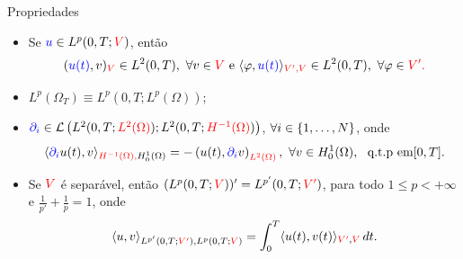 \begin{frame}{Propriedades}

\begin{itemize}
\item Se \({\color{blue}u}\in L^p(0,T;{\color{red}V})\), então 
\[
({\color{blue}u(t)},v)_{\color{red}V}\in L^2(0,T),\  \forall v\in {\color{red}V} \text{ e } \innp{\varphi,{\color{blue}u(t)}}_{{\color{red}V',V}}\in L^2(0,T), \ \forall \varphi \in {\color{red}V'.}
\]

\item \(L^p(\Omega_T)\equiv L^p(0,T;L^p(\Omega))\);
\medskip


\item \({\color{blue}\partial_i }\in
 \mathcal{L}\left(L^2(0,T;{\color{red}L^2(\Omega)});L^2(0,T;{\color{red}H^{-1}(\Omega)}) \right)\), 
\(\forall i\in \{1,\ldots,N\}\), onde 
\[
\langle{\color{blue}\partial_i} u(t),{v}\rangle_{{\color{red}H^{-1}(\Omega),}H_0^1(\Omega)}
=-\left(u(t),{\color{blue}\partial_i}{v}\right)_{{\color{red}L^2(\Omega)}},\
\forall v\in H_0^1(\Omega),\  \text{ q.t.p em} [0,T].
\]


\item Se \({\color{red}V}\) é separável, então 
\((L^p(0,T;{\color{red}V}))'=L^{p'}(0,T;{\color{red}V'})\), para todo \(1\leq p<+\infty\) e
$\frac{1}{p'}+\frac{1}{p}=1$, onde 
\[
\langle u,v\rangle_{L^{p'}(0,T;{\color{red}V'}),L^p(0,T;{\color{red}V})}
=\int_0^T \langle u(t),v(t)\rangle_{{\color{red}V'},{\color{red}V}}\, dt.
\]

\end{itemize}


\end{frame}

%
%
